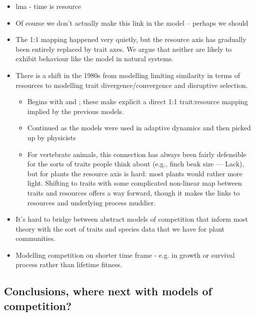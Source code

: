 \documentclass[a4paper,11pt]{article}
\begin{document}
\begin{itemize}
\item lma - time is resource
\item Of course we don't actually make this link in the model --
  perhaps we should
\item The 1:1 mapping happened very quietly, but the resource axis has
  gradually been entirely replaced by trait axes.  We argue that
  neither are likely to exhibit behaviour like the
  \citet{MacArthur-1967} model in natural systems.
\item There is a shift in the 1980s from modelling limiting
  similarity in terms of resources to modelling trait
  divergence/convergence and disruptive selection.
  \begin{itemize}
  \item Begins with \citet{Taper-1985} and \citet{Brown-1987-140}; these
    make explicit a direct 1:1 trait:resource mapping implied by the
    previous models.
  \item Continued as the models were used in adaptive dynamics
    \citep[e.g.,][]{Dieckmann-1999} and then picked up by physicists
    \citep[e.g.,][]{Leimar-2013}
  \item For vertebrate animals, this connection has always been fairly
    defensible for the sorts of traits people think about (e.g., finch
    beak size --- Lack), but for plants the resource axis is hard: most
    plants would rather more light.  Shifting to traits with some
    complicated non-linear map between traits and resources offers a way
    forward, though it makes the links to resources and underlying
    process muddier.
  \end{itemize}
\item It's hard to bridge between abstract models of competition that
  inform most theory with the sort of traits and species data that we
  have for plant communities.
\item Modelling competition on shorter time frame - e.g. in growth or
survival process rather than lifetime fitness. 
\end{itemize}

\subsection{Conclusions, where next with models of competition?}
\end{document}
